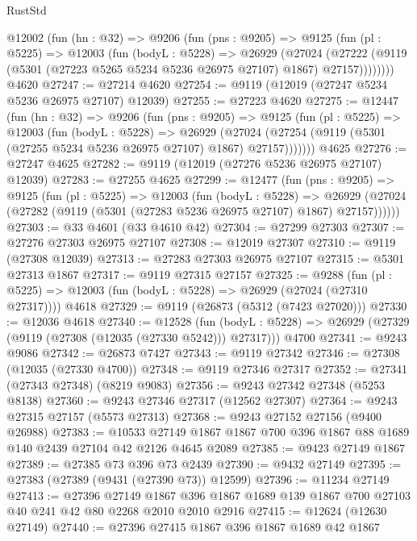 \begin{lexlean}{RustStd}
\begin{coremodule}
    @12002
      (fun (hn : @32) =>
      @9206
        (fun (pns : @9205) =>
        @9125
          (fun (pl : @5225) =>
          @12003
            (fun (bodyL : @5228) =>
            @26929
              (@27024
                (@27222 (@9119 (@5301 (@27223 @5265 @5234 @5236 @26975 @27107) @1867) @27157))))))))
    @4620
@27247 := @27214 @4620
@27254 := @9119 (@12019 (@27247 @5234 @5236 @26975 @27107) @12039)
@27255 := @27223 @4620
@27275 := @12447
    (fun (hn : @32) =>
    @9206
      (fun (pns : @9205) =>
      @9125
        (fun (pl : @5225) =>
        @12003
          (fun (bodyL : @5228) =>
          @26929
            (@27024 (@27254 (@9119 (@5301 (@27255 @5234 @5236 @26975 @27107) @1867) @27157)))))))
    @4625
@27276 := @27247 @4625
@27282 := @9119 (@12019 (@27276 @5236 @26975 @27107) @12039)
@27283 := @27255 @4625
@27299 := @12477
    (fun (pns : @9205) =>
    @9125
      (fun (pl : @5225) =>
      @12003
        (fun (bodyL : @5228) =>
        @26929 (@27024 (@27282 (@9119 (@5301 (@27283 @5236 @26975 @27107) @1867) @27157))))))
@27303 := @33 @4601 (@33 @4610 @42)
@27304 := @27299 @27303
@27307 := @27276 @27303 @26975 @27107
@27308 := @12019 @27307
@27310 := @9119 (@27308 @12039)
@27313 := @27283 @27303 @26975 @27107
@27315 := @5301 @27313 @1867
@27317 := @9119 @27315 @27157
@27325 := @9288
    (fun (pl : @5225) => @12003 (fun (bodyL : @5228) => @26929 (@27024 (@27310 @27317))))
    @4618
@27329 := @9119 (@26873 (@5312 (@7423 @27020)))
@27330 := @12036 @4618
@27340 := @12528
    (fun (bodyL : @5228) => @26929 (@27329 (@9119 (@27308 (@12035 (@27330 @5242))) @27317)))
    @4700
@27341 := @9243 @9086
@27342 := @26873 @7427
@27343 := @9119 @27342
@27346 := @27308 (@12035 (@27330 @4700))
@27348 := @9119 @27346 @27317
@27352 := @27341 (@27343 @27348) (@8219 @9083)
@27356 := @9243 @27342 @27348 (@5253 @8138)
@27360 := @9243 @27346 @27317 (@12562 @27307)
@27364 := @9243 @27315 @27157 (@5573 @27313)
@27368 := @9243 @27152 @27156 (@9400 @26988)
@27383 := @10533
    @27149
    @1867
    @1867
    @700
    @396
    @1867
    @88
    @1689
    @140
    @2439
    @27104
    @42
    @2126
    @4645
    @2089
@27385 := @9423 @27149 @1867
@27389 := @27385 @73 @396 @73 @2439
@27390 := @9432 @27149
@27395 := @27383 (@27389 (@9431 (@27390 @73)) @12599)
@27396 := @11234 @27149
@27413 := @27396
    @27149
    @1867
    @396
    @1867
    @1689
    @139
    @1867
    @700
    @27103
    @40
    @241
    @42
    @80
    @2268
    @2010
    @2010
    @2916
@27415 := @12624 (@12630 @27149)
@27440 := @27396
    @27415
    @1867
    @396
    @1867
    @1689
    @42
    @1867

\end{coremodule}
\end{lexlean}
